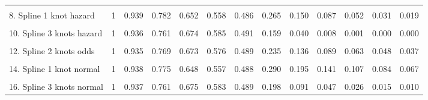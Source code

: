 \documentclass[
]{article}
\begin{document}
{\begin{tabular}{lrrrrrrrrrrrr}
\cellcolor{gray!6}{7. Generalised Gamma} & \cellcolor{gray!6}{1} & \cellcolor{gray!6}{0.937} & \cellcolor{gray!6}{0.774} & \cellcolor{gray!6}{0.648} & \cellcolor{gray!6}{0.556} & \cellcolor{gray!6}{0.488} & \cellcolor{gray!6}{0.310} & \cellcolor{gray!6}{0.232} & \cellcolor{gray!6}{0.187} & \cellcolor{gray!6}{0.158} & \cellcolor{gray!6}{0.138} & \cellcolor{gray!6}{0.122}\\
8. Spline 1 knot hazard & 1 & 0.939 & 0.782 & 0.652 & 0.558 & 0.486 & 0.265 & 0.150 & 0.087 & 0.052 & 0.031 & 0.019\\
\cellcolor{gray!6}{9. Spline 2 knots hazard} & \cellcolor{gray!6}{1} & \cellcolor{gray!6}{0.935} & \cellcolor{gray!6}{0.766} & \cellcolor{gray!6}{0.673} & \cellcolor{gray!6}{0.579} & \cellcolor{gray!6}{0.490} & \cellcolor{gray!6}{0.184} & \cellcolor{gray!6}{0.061} & \cellcolor{gray!6}{0.018} & \cellcolor{gray!6}{0.005} & \cellcolor{gray!6}{0.001} & \cellcolor{gray!6}{0.000}\\
10. Spline 3 knots hazard & 1 & 0.936 & 0.761 & 0.674 & 0.585 & 0.491 & 0.159 & 0.040 & 0.008 & 0.001 & 0.000 & 0.000\\
\cellcolor{gray!6}{11. Spline 1 knot odds} & \cellcolor{gray!6}{1} & \cellcolor{gray!6}{0.939} & \cellcolor{gray!6}{0.778} & \cellcolor{gray!6}{0.648} & \cellcolor{gray!6}{0.556} & \cellcolor{gray!6}{0.489} & \cellcolor{gray!6}{0.301} & \cellcolor{gray!6}{0.213} & \cellcolor{gray!6}{0.162} & \cellcolor{gray!6}{0.131} & \cellcolor{gray!6}{0.109} & \cellcolor{gray!6}{0.093}\\
12. Spline 2 knots odds & 1 & 0.935 & 0.769 & 0.673 & 0.576 & 0.489 & 0.235 & 0.136 & 0.089 & 0.063 & 0.048 & 0.037\\
\cellcolor{gray!6}{13. Spline 3 knots odds} & \cellcolor{gray!6}{1} & \cellcolor{gray!6}{0.937} & \cellcolor{gray!6}{0.761} & \cellcolor{gray!6}{0.675} & \cellcolor{gray!6}{0.583} & \cellcolor{gray!6}{0.489} & \cellcolor{gray!6}{0.207} & \cellcolor{gray!6}{0.108} & \cellcolor{gray!6}{0.066} & \cellcolor{gray!6}{0.044} & \cellcolor{gray!6}{0.032} & \cellcolor{gray!6}{0.024}\\
14. Spline 1 knot normal & 1 & 0.938 & 0.775 & 0.648 & 0.557 & 0.488 & 0.290 & 0.195 & 0.141 & 0.107 & 0.084 & 0.067\\
\cellcolor{gray!6}{15. Spline 2 knots normal} & \cellcolor{gray!6}{1} & \cellcolor{gray!6}{0.930} & \cellcolor{gray!6}{0.773} & \cellcolor{gray!6}{0.669} & \cellcolor{gray!6}{0.572} & \cellcolor{gray!6}{0.489} & \cellcolor{gray!6}{0.240} & \cellcolor{gray!6}{0.135} & \cellcolor{gray!6}{0.083} & \cellcolor{gray!6}{0.054} & \cellcolor{gray!6}{0.037} & \cellcolor{gray!6}{0.026}\\
16. Spline 3 knots normal & 1 & 0.937 & 0.761 & 0.675 & 0.583 & 0.489 & 0.198 & 0.091 & 0.047 & 0.026 & 0.015 & 0.010\\
\bottomrule
\end{tabular}}
\end{document}
